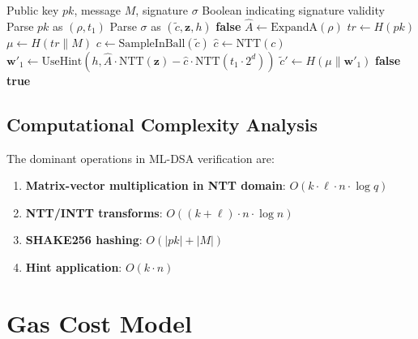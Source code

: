 \documentclass[11pt,a4paper]{article}
\begin{document}
\begin{algorithm}
\caption{ML-DSA.Verify$(pk, M, \sigma)$}
\label{alg:verify}
\begin{algorithmic}[1]
\Require Public key $pk$, message $M$, signature $\sigma$
\Ensure Boolean indicating signature validity
\State Parse $pk$ as $(\rho, t_1)$ 
\State Parse $\sigma$ as $(\tilde{c}, \mathbf{z}, h)$ 
    \Return \textbf{false} 
\EndIf
\State $\hat{A} \gets \text{ExpandA}(\rho)$ 
\State $tr \gets H(pk)$ 
\State $\mu \gets H(tr \| M)$ 
\State $c \gets \text{SampleInBall}(\tilde{c})$ 
\State $\hat{c} \gets \text{NTT}(c)$ 
\State $\mathbf{w}'_1 \gets \text{UseHint}(h, \hat{A} \cdot \text{NTT}(\mathbf{z}) - \hat{c} \cdot \text{NTT}(t_1 \cdot 2^d))$ 
\State $\tilde{c}' \gets H(\mu \| \mathbf{w}'_1)$ 
    \Return \textbf{false}
\EndIf
\Return \textbf{true}
\end{algorithmic}
\end{algorithm}

\subsection{Computational Complexity Analysis}

The dominant operations in ML-DSA verification are:

\begin{enumerate}
    \item \textbf{Matrix-vector multiplication in NTT domain}: $O(k \cdot \ell \cdot n \cdot \log q)$
    \item \textbf{NTT/INTT transforms}: $O((k + \ell) \cdot n \cdot \log n)$
    \item \textbf{SHAKE256 hashing}: $O(|pk| + |M|)$
    \item \textbf{Hint application}: $O(k \cdot n)$
\end{enumerate}

\section{Gas Cost Model}
\end{document}
